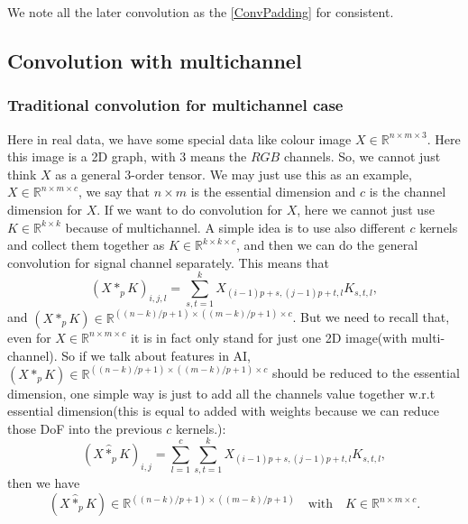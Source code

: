 \begin{remark}We note all the later convolution as the \eqref{ConvPadding} for consistent.

\end{remark}

\subsection{Convolution with multichannel}
\subsubsection{Traditional convolution for multichannel case}
Here in real data, we have some special data like colour image $X \in \mathbb{R}^{n \times m \times3}$. Here this image is a 2D graph, with $3$ means the $RGB$ channels. So, we cannot just think $X$ as a general $3$-order tensor. We may just use this as an example, $X \in \mathbb{R}^{n\times m \times c}$, we say that $n \times m$ is the essential dimension and $c$ is the channel dimension for $X$. If we want to do convolution for $X$, here we cannot just use $K \in \mathbb{R}^{k\times k}$ because of multichannel. A simple idea is to use also different $c$ kernels and collect them together as $K \in \mathbb{R}^{k\times k \times c}$, and then we can do the general convolution for signal channel separately. This means that 
\begin{equation}
(X\ast_{p} K)_{i,j,l} = \sum_{s, t = 1}^k X_{(i-1)p + s, (j-1)p + t,l} K_{s,t,l},
\end{equation}
and $(X\ast_p K) \in \mathbb{R}^{((n-k)/p + 1)\times ((m-k)/p+1) \times c}$. But we need to recall that, even for $X \in \mathbb{R}^{n\times m \times c}$ it is in fact only stand for just one 2D image(with multi-channel). So if we talk about features in AI, $(X\ast_p K) \in \mathbb{R}^{((n-k)/p + 1)\times ((m-k)/p+1) \times c}$ should be reduced to the essential dimension, one simple way is just to add all the channels value together w.r.t essential dimension(this is equal to added with weights because we can reduce those DoF into the previous $c$ kernels.):
\begin{equation}
(X \hat{\ast}_p K)_{i,j} = \sum_{l=1}^{c} \sum_{s, t = 1}^k X_{(i-1)p + s, (j-1)p + t,l} K_{s,t,l},
\end{equation}
then we have
\begin{equation}
(X \hat{\ast}_p K) \in \mathbb{R}^{((n-k)/p + 1) \times ((m-k)/p+1)} \quad \text{with} \quad K \in \mathbb{R}^{n \times m \times c}.
\end{equation}
